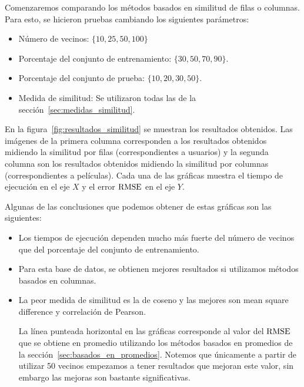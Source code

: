 Comenzaremos comparando los métodos basados en similitud de filas o columnas. Para esto, se hicieron pruebas cambiando los siguientes parámetros:
\begin{itemize}
    \item Número de vecinos: $\{10, 25, 50, 100\}$
    \item Porcentaje del conjunto de entrenamiento: $\{30, 50, 70, 90\}$.
    \item Porcentaje del conjunto de prueba: $\{10, 20, 30, 50\}$.
    \item Medida de similitud: Se utilizaron todas las de la sección~\ref{sec:medidas_similitud}.
\end{itemize}
En la figura~\ref{fig:resultados_similitud} se muestran los resultados obtenidos. Las imágenes de la primera columna corresponden a los resultados obtenidos midiendo la similitud por filas (correspondientes a usuarios) y la segunda columna son los resultados obtenidos midiendo la similitud por columnas (correspondientes a películas). Cada una de las gráficas muestra el tiempo de ejecución en el eje $X$ y el error $\operatorname{RMSE}$ en el eje $Y$.

Algunas de las conclusiones que podemos obtener de estas gráficas son las siguientes:
\begin{itemize}
    \item Los tiempos de ejecución dependen mucho más fuerte del número de vecinos que del porcentaje del conjunto de entrenamiento.
    \item Para esta base de datos, se obtienen mejores resultados si utilizamos métodos basados en columnas.
    \item La peor medida de similitud es la de coseno y las mejores son mean square difference y correlación de Pearson.

        La línea punteada horizontal en las gráficas corresponde al valor del $\operatorname{RMSE}$ que se obtiene en promedio utilizando los métodos basados en promedios de la sección~\ref{sec:basados_en_promedios}. Notemos que únicamente a partir de utilizar 50 vecinos empezamos a tener resultados que mejoran este valor, sin embargo las mejoras son bastante significativas.
\end{itemize}
